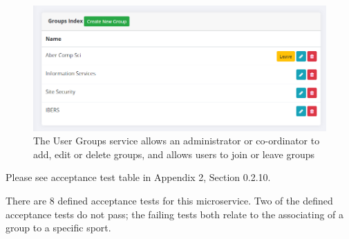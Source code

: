 \begin{figure}[H]
    \centering
    \includegraphics[width=\textwidth]{Images/service_groups.png}
    \caption{The User Groups service allows an administrator or co-ordinator to add, edit or delete groups, and allows users to join or leave groups}
\end{figure}

Please see acceptance test table in Appendix 2, Section 0.2.10.

There are 8 defined acceptance tests for this microservice. Two of the defined acceptance tests do not pass; the failing tests both relate to the associating of a group to a specific sport.